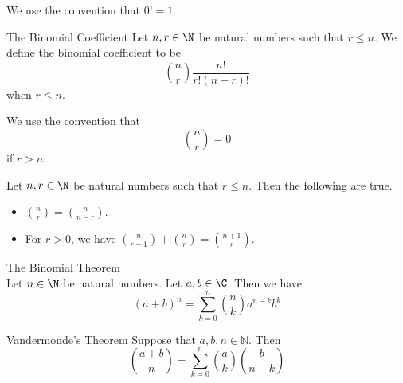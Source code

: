 \documentclass[a4paper]{article}
\begin{document}
We use the convention that $0!=1$. 

\begin{defn}{The Binomial Coefficient}{} Let $n,r\in\N$ be natural numbers such that $r\leq n$. We define the binomial coefficient to be $$\binom{n}{r}\frac{n!}{r!(n-r)!}$$ when $r\leq n$. 
\end{defn}

We use the convention that $$\binom{n}{r}=0$$ if $r>n$. 

\begin{prp}{}{} Let $n,r\in\N$ be natural numbers such that $r\leq n$. Then the following are true. 
\begin{itemize}
\item $\binom{n}{r}=\binom{n}{n-r}$. 
\item For $r>0$, we have $\binom{n}{r-1}+\binom{n}{r}=\binom{n+1}{r}$. 
\end{itemize}
\end{prp}

\begin{thm}{The Binomial Theorem}{}\\
Let $n\in\N$ be natural numbers. Let $a,b\in\C$. Then we have $$(a+b)^n=\sum_{k=0}^n\binom{n}{k}a^{n-k}b^k$$
\end{thm}

\begin{thm}{Vandermonde's Theorem}{} Suppose that $a,b,n\in\mathbb{N}$. Then $$\binom{a+b}{n}=\sum_{k=0}^{n}\binom{a}{k}\binom{b}{n-k}$$
\end{thm}
\end{document}
